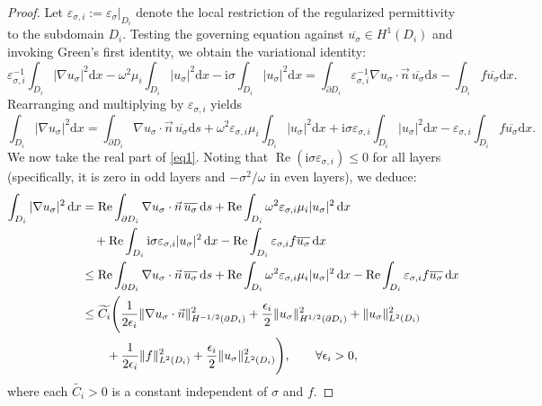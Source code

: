 \documentclass[12pt,reqno]{amsart}
\numberwithin{equation}{section}
\begin{document}
\begin{proof}
Let $\varepsilon_{\sigma,i} := \varepsilon_\sigma|_{D_i}$ denote the local restriction of the regularized permittivity to the subdomain $D_i$. Testing the governing equation against $\overline{u_\sigma} \in H^1(D_i)$ and invoking Green’s first identity, we obtain the variational identity:
\begin{equation*}
\varepsilon_{\sigma,i}^{-1} \int_{D_i} |\nabla u_\sigma|^2 \mathrm{d}x - \omega^2 \mu_i \int_{D_i} |u_\sigma|^2 \mathrm{d}x - \mathrm{i}\sigma \int_{D_i} |u_\sigma|^2 \mathrm{d}x = \int_{\partial D_i} \varepsilon_{\sigma,i}^{-1} \nabla u_\sigma \cdot \vec{n} \, \overline{u_\sigma} \mathrm{d}s - \int_{D_i} f \overline{u_\sigma} \mathrm{d}x.
\end{equation*}
Rearranging and multiplying by $\varepsilon_{\sigma,i}$ yields
\begin{equation}\label{eq1}
\int_{D_i} |\nabla u_\sigma|^2 \mathrm{d}x = \int_{\partial D_i} \nabla u_\sigma \cdot \vec{n} \, \overline{u_\sigma} \mathrm{d}s + \omega^2 \varepsilon_{\sigma,i} \mu_i \int_{D_i} |u_\sigma|^2 \mathrm{d}x + \mathrm{i}\sigma \varepsilon_{\sigma,i} \int_{D_i} |u_\sigma|^2 \mathrm{d}x - \varepsilon_{\sigma,i} \int_{D_i} f \overline{u_\sigma} \mathrm{d}x.
\end{equation}
We now take the real part of \eqref{eq1}. Noting that $\operatorname{Re}(\mathrm{i}\sigma \varepsilon_{\sigma,i}) \le 0$ for all layers (specifically, it is zero in odd layers and $-\sigma^2/\omega$ in even layers), we deduce:
\begin{align}\label{eq2}
\int_{D_i} |\nabla u_\sigma|^2 \,{\rm d}x
&= \operatorname{Re} \int_{\partial D_i} \nabla u_\sigma \cdot \vec{n} \, \overline{u_\sigma} \,{\rm d}s
+ \operatorname{Re} \int_{D_i} \omega^2 \varepsilon_{\sigma,i} \mu_i |u_\sigma|^2 \,{\rm d}x \nonumber \\
&\quad + \operatorname{Re} \int_{D_i} {\rm i}\sigma \varepsilon_{\sigma,i} |u_\sigma|^2 \,{\rm d}x
- \operatorname{Re} \int_{D_i} \varepsilon_{\sigma,i} f \overline{u_\sigma} \,{\rm d}x  \nonumber\\
&\leq \operatorname{Re} \int_{\partial D_i} \nabla u_\sigma \cdot \vec{n} \, \overline{u_\sigma} \,{\rm d}s
+ \operatorname{Re} \int_{D_i} \omega^2 \varepsilon_{\sigma,i} \mu_i |u_\sigma|^2 \,{\rm d}x
- \operatorname{Re} \int_{D_i} \varepsilon_{\sigma,i} f \overline{u_\sigma} \,{\rm d}x  \nonumber\\
&\leq \widetilde{C_i} \Bigg( \frac{1}{2\epsilon_i} \|\nabla u_\sigma \cdot \vec{n}\|_{H^{-1/2}(\partial D_i)}^2
+ \frac{\epsilon_i}{2} \|u_\sigma\|_{H^{1/2}(\partial D_i)}^2
+ \|u_\sigma\|_{L^2(D_i)}^2 \nonumber \\
&\qquad + \frac{1}{2\epsilon_i} \|f\|_{L^2(D_i)}^2
+ \frac{\epsilon_i}{2} \|u_\sigma\|_{L^2(D_i)}^2 \Bigg), \qquad \forall \epsilon_i > 0,
\end{align}
where each $\widetilde{C_i} > 0$ is a constant independent of $\sigma$ and $f$.







\end{proof}
\end{document}
